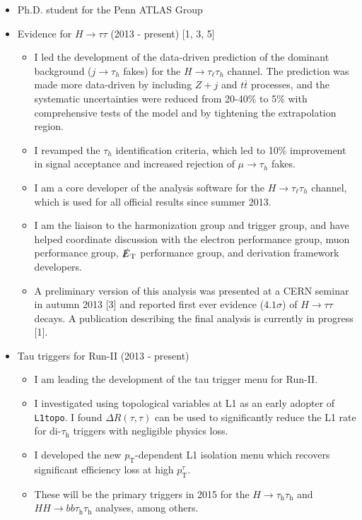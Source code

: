 \documentclass{resume2}
\begin{document}
\begin{resume}
\begin{itemize}
\item Ph.D. student for the Penn ATLAS Group
\item Evidence for $H\!\rightarrow\!\tau\tau$ (2013 - present) [1, 3, 5]
  \begin{itemize}
  \item I led the development of the data-driven prediction of the dominant background ($j\!\rightarrow\!\tau_h$ fakes) for the $H\!\rightarrow\!\tau_\ell\tau_h$ channel. The prediction was made more data-driven by including $Z+j$ and $t\overline{t}$ processes, and the systematic uncertainties were reduced from 20-40\% to 5\% with comprehensive tests of the model and by tightening the extrapolation region.
  \item I revamped the $\tau_h$ identification criteria, which led to 10\% improvement in signal acceptance and increased rejection of $\mu\!\rightarrow\!\tau_h$ fakes.
  \item I am a core developer of the analysis software for the $H\!\rightarrow\!\tau_\ell\tau_h$ channel, which is used for all official results since summer 2013. 
  \item I am the liaison to the harmonization group and trigger group, and have helped coordinate discussion with the electron performance group, muon performance group, $\slashed{E}_{\text{T}}$ performance group, and derivation framework developers.
  \item A preliminary version of this analysis was presented at a CERN seminar in autumn 2013 [3] and reported first ever evidence ($4.1\sigma$) of $H\!\rightarrow\!\tau\tau$ decays. A publication describing the final analysis is currently in progress [1].
  \end{itemize}

\item Tau triggers for Run-II (2013 - present)
  \begin{itemize}
  \item I am leading the development of the tau trigger menu for Run-II.
  \item I investigated using topological variables at L1 as an early adopter of \texttt{L1topo}. I found $\Delta R(\tau, \tau)$ can be used to significantly reduce the L1 rate for di-$\tau_\text{h}$ triggers with negligible physics loss.
  \item I developed the new $p_\text{T}$-dependent L1 isolation menu which recovers significant efficiency loss at high $p_\text{T}^\tau$.
  \item These will be the primary triggers in 2015 for the $H\!\rightarrow\!\tau_\text{h}\tau_\text{h}$ and $HH\!\rightarrow\!bb\tau_\text{h}\tau_\text{h}$ analyses, among others.
  \end{itemize}


\end{itemize}
\end{resume}
\end{document}
